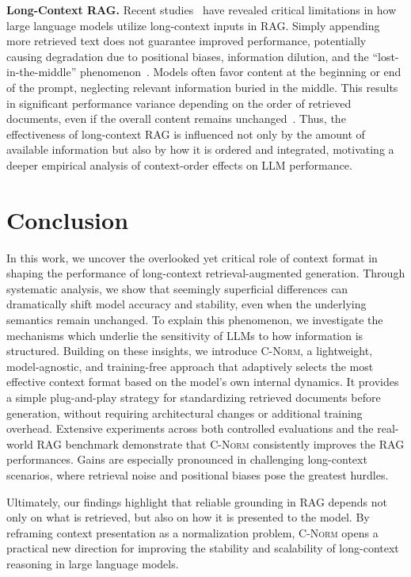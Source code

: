 \documentclass{article} %
\newcommand{\cnorm}{\textsc{C-Norm}}
\begin{document}
\textbf{Long-Context RAG.}
Recent studies~\citep{DBLP:journals/tacl/LiuLHPBPL24,zhangfound,an2024make,liu2024likelihood} have revealed critical limitations in how large language models utilize long-context inputs in RAG. Simply appending more retrieved text does not guarantee improved performance, potentially causing degradation due to positional biases, information dilution, and the ``lost-in-the-middle'' phenomenon~\citep{DBLP:journals/tacl/LiuLHPBPL24}. Models often favor content at the beginning or end of the prompt, neglecting relevant information buried in the middle. This results in significant performance variance depending on the order of retrieved documents, even if the overall content remains unchanged~\citep{liu2024likelihood,zhangfound,an2024make}. Thus, the effectiveness of long-context RAG is influenced not only by the amount of available information but also by how it is ordered and integrated, motivating a deeper empirical analysis of context-order effects on LLM performance.

\section{Conclusion}
In this work, we uncover the overlooked yet critical role of context format in shaping the performance of long-context retrieval-augmented generation. Through systematic analysis, we show that seemingly superficial differences can dramatically shift model accuracy and stability, even when the underlying semantics remain unchanged. To explain this phenomenon, we investigate the mechanisms which underlie the sensitivity of LLMs to how information is structured.
Building on these insights, we introduce \cnorm{}, a lightweight, model-agnostic, and training-free approach that adaptively selects the most effective context format based on the model’s own internal dynamics. It provides a simple plug-and-play strategy for standardizing retrieved documents before generation, without requiring architectural changes or additional training overhead.
Extensive experiments across both controlled evaluations and the real-world RAG benchmark demonstrate that \cnorm{} consistently improves the RAG performances. Gains are especially pronounced in challenging long-context scenarios, where retrieval noise and positional biases pose the greatest hurdles.

Ultimately, our findings highlight that reliable grounding in RAG depends not only on what is retrieved, but also on how it is presented to the model. By reframing context presentation as a normalization problem, \cnorm{} opens a practical new direction for improving the stability and scalability of long-context reasoning in large language models.
\end{document}
